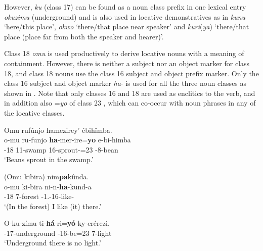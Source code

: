 \documentclass[output=paper]{langscibook}
\begin{document}
However, \textit{ku} (class 17) can be found as a noun class prefix in one lexical entry \textit{okuzimu} (underground) and is also used in locative demonstratives \citep[see][]{Asiimwe2024} as in \textit{kunu} ‘here/this place’, \textit{okwo} ‘there/that place near speaker’ and \textit{kuri}(\textit{ya}) ‘there/that place (place far from both the speaker and hearer)’. 

Class 18 \textit{omu} is used productively to derive locative nouns with a meaning of containment. However, there is neither a subject nor an object marker for class 18, and class 18 nouns use the class 16 subject and object prefix marker. Only the class 16 subject and object marker \textit{ha}- is used for all the three noun classes as shown in  \citep[but see][]{Asiimwe2014, BeermannAsiimweFut}. Note that only classes 16 and 18 are used as enclitics to the verb, and in addition also =\textit{yo} of class 23 , which can co-occur with noun phrases in any of the locative classes.

\ea
\label{bkm:Ref113444051}
Omu rufûnjo hamezirey’ ébihîmba.\\\nobreak
\gll
o-mu  ru-funjo  \textbf{ha}-mer-ire=\textbf{yo}  e-bi-himba\\
\AUG{}-18  11-swamp  16\SM{}-sprout-\PFV{}=23  \AUG{}-8-bean\\
\glt
‘Beans sprout in the swamp.’\\


\z

\ea
(Omu kibira) nim\textbf{pa}kûnda.\\
\gll
o-mu  ki-bira  ni-n-\textbf{ha}-kund-a\\
\AUG{}-18  7-forest  \IPFV{}-1\SG{}.\SM{}-16\OM{}-like-\FV{}\\
\glt
‘(In the forest) I like (it) there.’\\


\z

\ea
\label{bkm:Ref113444066}
\label{bkm:Ref127966346}
\gll
O-ku-zímu  ti-\textbf{há}-ri=\textbf{yó}  ky-erérezi.\\
\AUG{}-17-underground  \NEG{}-16\SM{}-be=23{}  7-light\\
\glt
`Underground there is no light.’\\
\end{document}
